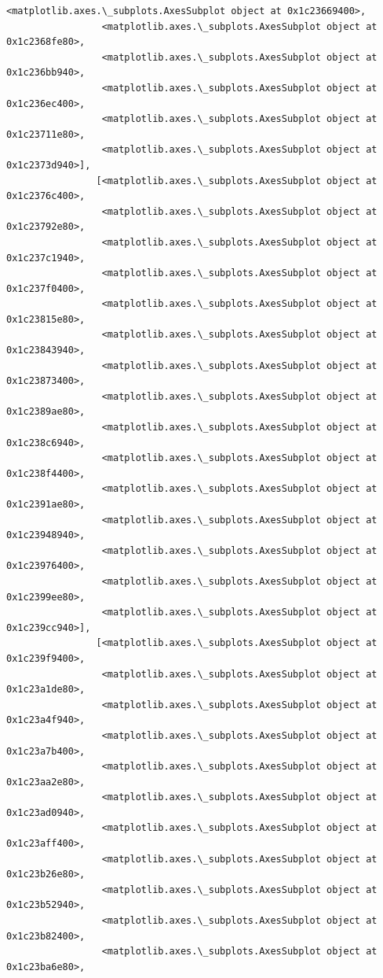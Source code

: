 \documentclass[11pt]{article}
\begin{document}
\begin{Verbatim}[commandchars=\\\{\}]
                 <matplotlib.axes.\_subplots.AxesSubplot object at 0x1c23669400>,
                 <matplotlib.axes.\_subplots.AxesSubplot object at 0x1c2368fe80>,
                 <matplotlib.axes.\_subplots.AxesSubplot object at 0x1c236bb940>,
                 <matplotlib.axes.\_subplots.AxesSubplot object at 0x1c236ec400>,
                 <matplotlib.axes.\_subplots.AxesSubplot object at 0x1c23711e80>,
                 <matplotlib.axes.\_subplots.AxesSubplot object at 0x1c2373d940>],
                [<matplotlib.axes.\_subplots.AxesSubplot object at 0x1c2376c400>,
                 <matplotlib.axes.\_subplots.AxesSubplot object at 0x1c23792e80>,
                 <matplotlib.axes.\_subplots.AxesSubplot object at 0x1c237c1940>,
                 <matplotlib.axes.\_subplots.AxesSubplot object at 0x1c237f0400>,
                 <matplotlib.axes.\_subplots.AxesSubplot object at 0x1c23815e80>,
                 <matplotlib.axes.\_subplots.AxesSubplot object at 0x1c23843940>,
                 <matplotlib.axes.\_subplots.AxesSubplot object at 0x1c23873400>,
                 <matplotlib.axes.\_subplots.AxesSubplot object at 0x1c2389ae80>,
                 <matplotlib.axes.\_subplots.AxesSubplot object at 0x1c238c6940>,
                 <matplotlib.axes.\_subplots.AxesSubplot object at 0x1c238f4400>,
                 <matplotlib.axes.\_subplots.AxesSubplot object at 0x1c2391ae80>,
                 <matplotlib.axes.\_subplots.AxesSubplot object at 0x1c23948940>,
                 <matplotlib.axes.\_subplots.AxesSubplot object at 0x1c23976400>,
                 <matplotlib.axes.\_subplots.AxesSubplot object at 0x1c2399ee80>,
                 <matplotlib.axes.\_subplots.AxesSubplot object at 0x1c239cc940>],
                [<matplotlib.axes.\_subplots.AxesSubplot object at 0x1c239f9400>,
                 <matplotlib.axes.\_subplots.AxesSubplot object at 0x1c23a1de80>,
                 <matplotlib.axes.\_subplots.AxesSubplot object at 0x1c23a4f940>,
                 <matplotlib.axes.\_subplots.AxesSubplot object at 0x1c23a7b400>,
                 <matplotlib.axes.\_subplots.AxesSubplot object at 0x1c23aa2e80>,
                 <matplotlib.axes.\_subplots.AxesSubplot object at 0x1c23ad0940>,
                 <matplotlib.axes.\_subplots.AxesSubplot object at 0x1c23aff400>,
                 <matplotlib.axes.\_subplots.AxesSubplot object at 0x1c23b26e80>,
                 <matplotlib.axes.\_subplots.AxesSubplot object at 0x1c23b52940>,
                 <matplotlib.axes.\_subplots.AxesSubplot object at 0x1c23b82400>,
                 <matplotlib.axes.\_subplots.AxesSubplot object at 0x1c23ba6e80>,

\end{Verbatim}
\end{document}
